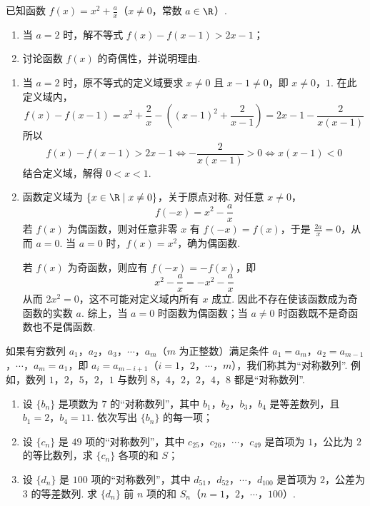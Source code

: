 \begin{problem}
已知函数 \(f(x) = x^2 + \frac{a}{x}\)（\(x \neq 0\)，常数 \(a \in \R\)）.

\begin{enumerate}
\item 当 \(a = 2\) 时，解不等式 \(f(x) - f(x - 1) > 2x - 1\)；
\item 讨论函数 \(f(x)\) 的奇偶性，并说明理由.
\end{enumerate}
\end{problem}

\begin{solution}
\begin{enumerate}
\item 当 \(a=2\) 时，原不等式的定义域要求 \(x\neq0\) 且 \(x-1\neq0\)，即 \(x\neq0\)，\(1\). 在此定义域内，
\[
f(x)-f(x-1)=x^2+\frac{2}{x}-\left((x-1)^2+\frac{2}{x-1}\right)=2x-1-\frac{2}{x(x-1)}
\]
所以
\[
f(x)-f(x-1)>2x-1\Longleftrightarrow-\frac{2}{x(x-1)}>0\Longleftrightarrow x(x-1)<0
\]
结合定义域，解得 \(0<x<1\).

\item 函数定义域为 \(\{x\in\R\mid x\neq0\}\)，关于原点对称. 对任意 \(x\neq0\)，
\[
f(-x)=x^2-\frac{a}{x}
\]
若 \(f(x)\) 为偶函数，则对任意非零 \(x\) 有 \(f(-x)=f(x)\)，于是 \(\frac{2a}{x}=0\)，从而 \(a=0\). 当 \(a=0\) 时，\(f(x)=x^2\)，确为偶函数.

若 \(f(x)\) 为奇函数，则应有 \(f(-x)=-f(x)\)，即
\[
x^2-\frac{a}{x}=-x^2-\frac{a}{x}
\]
从而 \(2x^2=0\)，这不可能对定义域内所有 \(x\) 成立. 因此不存在使该函数成为奇函数的实数 \(a\). 综上，当 \(a=0\) 时函数为偶函数；当 \(a\neq0\) 时函数既不是奇函数也不是偶函数.
\end{enumerate}
\end{solution}

\begin{problem}
如果有穷数列 \(a_1\)，\(a_2\)，\(a_3\)，\(\cdots\)，\(a_m\)（\(m\) 为正整数）满足条件 \(a_1 = a_m\)，\(a_2 = a_{m-1}\)，\(\cdots\)，\(a_m = a_1\)，即 \(a_i = a_{m-i+1}\)（\(i = 1\)，\(2\)，\(\cdots\)，\(m\)），我们称其为“对称数列”. 例如，数列 \(1\)，\(2\)，\(5\)，\(2\)，\(1\) 与数列 \(8\)，\(4\)，\(2\)，\(2\)，\(4\)，\(8\) 都是“对称数列”.

\begin{enumerate}
\item 设 \(\{b_n\}\) 是项数为 \(7\) 的“对称数列”，其中 \(b_1\)，\(b_2\)，\(b_3\)，\(b_4\) 是等差数列，且 \(b_1 = 2\)，\(b_4 = 11\). 依次写出 \(\{b_n\}\) 的每一项；
\item 设 \(\{c_n\}\) 是 \(49\) 项的“对称数列”，其中 \(c_{25}\)，\(c_{26}\)，\(\cdots\)，\(c_{49}\) 是首项为 \(1\)，公比为 \(2\) 的等比数列，求 \(\{c_n\}\) 各项的和 \(S\)；
\item 设 \(\{d_n\}\) 是 \(100\) 项的“对称数列”，其中 \(d_{51}\)，\(d_{52}\)，\(\cdots\)，\(d_{100}\) 是首项为 \(2\)，公差为 \(3\) 的等差数列. 求 \(\{d_n\}\) 前 \(n\) 项的和 \(S_n\)（\(n = 1\)，\(2\)，\(\cdots\)，\(100\)）.
\end{enumerate}
\end{problem}

